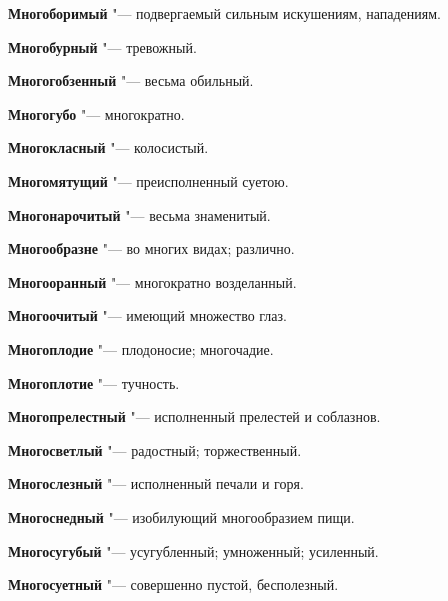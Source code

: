 \begin{mymulticols}{2}
\noindent\textbf{Многоборимый} "--- подвергаемый сильным искушениям, нападениям. 




\noindent\textbf{Многобурный} "--- тревожный. 




\noindent\textbf{Многогобзенный} "--- весьма обильный. 




\noindent\textbf{Многогубо} "--- многократно. 




\noindent\textbf{Многокласный} "--- колосистый. 




\noindent\textbf{Многомятущий} "--- преисполненный суетою. 




\noindent\textbf{Многонарочитый} "--- весьма знаменитый. 




\noindent\textbf{Многообразне} "--- во многих видах; различно. 




\noindent\textbf{Многооранный} "--- многократно возделанный. 




\noindent\textbf{Многоочитый} "--- имеющий множество глаз. 




\noindent\textbf{Многоплодие} "--- плодоносие; многочадие. 




\noindent\textbf{Многоплотие} "--- тучность. 




\noindent\textbf{Многопрелестный} "--- исполненный прелестей и соблазнов. 




\noindent\textbf{Многосветлый} "--- радостный; торжественный. 




\noindent\textbf{Многослезный} "--- исполненный печали и горя. 




\noindent\textbf{Многоснедный} "--- изобилующий многообразием пищи. 




\noindent\textbf{Многосугубый} "--- усугубленный; умноженный; усиленный. 




\noindent\textbf{Многосуетный} "--- совершенно пустой, бесполезный. 





\end{mymulticols}
